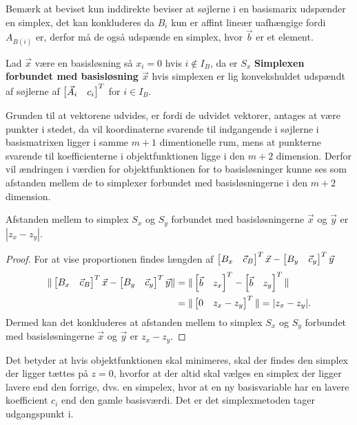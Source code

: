 Bemærk at beviset kun inddirekte beviser at søjlerne i en basismarix udspænder en simplex, det kan konkluderes da $B_i$ kun er affint lineær uafhængige fordi $A_{B(i)}$ er, derfor må de også udspænde en simplex, hvor $\vec{b}$ er et element.
\begin{defn}
Lad $\vec{x}$ være en basisløsning så $x_i = 0$ hvis $i \notin I_B$, da er $S_x$ \textbf{Simplexen forbundet med basisløsning $\vec{x}$} hvis simplexen er lig konvekshuldet udspændt af søjlerne af $\begin{bmatrix} \vec{A}_i & c_i \end{bmatrix}^T$ for $i \in I_B$.
\end{defn}
Grunden til at vektorene udvides, er fordi de udvidet vektorer, antages at være punkter i stedet, da vil koordinaterne svarende til indgangende i søjlerne i basismatrixen ligger i samme $m+1$ dimentionelle rum, mens at punkterne svarende til koefficienterne i objektfunktionen ligge i den $m+2$ dimension.  
Derfor vil ændringen i værdien for objektfunktionen for to basisløsninger kunne ses som afstanden mellem de to simplexer forbundet med basisløsningerne i den $m+2$ dimension.
\begin{prop}
Afstanden mellem to simplex $S_x$ og $S_y$ forbundet med basisløsningerne $\vec{x}$ og $\vec{y}$ er $|z_x - z_y|$.
\end{prop}
\begin{proof}
For at vise proportionen findes længden af $\begin{bmatrix} B_x & \vec{c}_B \end{bmatrix}^T \vec{x} - \begin{bmatrix} B_y & \vec{c}_y \end{bmatrix}^T \vec{y}$
\begin{align*}
 \Vert \begin{bmatrix} B_x & \vec{c}_B \end{bmatrix}^T \vec{x} - \begin{bmatrix} B_y & \vec{c}_y \end{bmatrix}^T \vec{y} \Vert & =  \Vert \begin{bmatrix} \vec{b} & z_x \end{bmatrix}^T  - \begin{bmatrix} \vec{b} & z_y \end{bmatrix}^T  \Vert
 \\ & = \Vert \begin{bmatrix} 0 & z_x - z_y \end{bmatrix}^T \Vert = |z_x - z_y|.
\end{align*}
Dermed kan det konkluderes at afstanden mellem to simplex $S_x$ og $S_y$ forbundet med basisløsningerne $\vec{x}$ og $\vec{y}$ er $z_x - z_y$.
\end{proof}
Det betyder at hvis objektfunktionen skal minimeres, skal der findes den simplex der ligger tættes på $z = 0$, hvorfor at der altid skal vælges en simplex der ligger lavere end den forrige, dvs. en simpelex, hvor at en ny basisvariable har en lavere koefficient $c_i$ end den gamle basisværdi.
Det er det simplexmetoden tager udgangspunkt i.

